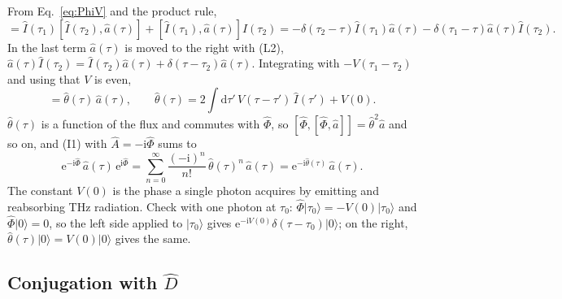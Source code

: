 \documentclass[aps,pra,onecolumn,notitlepage,11pt,amsmath,amssymb,nofootinbib]{revtex4-2}
\newcommand{\Iop}{\hat I}
\newcommand{\dd}{\mathrm{d}}
\newcommand{\ee}{\mathrm{e}}
\newcommand{\ii}{\mathrm{i}}
\begin{document}
From Eq.~\eqref{eq:PhiV} and the product rule,
\begin{equation}
[\Iop(\tau_1)\Iop(\tau_2),\hat a(\tau)]
=\Iop(\tau_1)[\Iop(\tau_2),\hat a(\tau)]+[\Iop(\tau_1),\hat a(\tau)]\Iop(\tau_2)
=-\delta(\tau_2-\tau)\Iop(\tau_1)\hat a(\tau)-\delta(\tau_1-\tau)\hat a(\tau)\Iop(\tau_2).
\end{equation}
In the last term $\hat a(\tau)$ is moved to the right with (L2),
$\hat a(\tau)\Iop(\tau_2)=\Iop(\tau_2)\hat a(\tau)+\delta(\tau-\tau_2)\hat a(\tau)$.
Integrating with $-V(\tau_1-\tau_2)$ and using that $V$ is even,
\begin{equation}
[\hat\Phi,\hat a(\tau)]=\hat\theta(\tau)\,\hat a(\tau),\qquad
\hat\theta(\tau)=2\int\!\dd\tau'\,V(\tau-\tau')\,\Iop(\tau')+V(0).
\label{eq:thetaK}
\end{equation}
$\hat\theta(\tau)$ is a function of the flux and commutes with $\hat\Phi$, so
$[\hat\Phi,[\hat\Phi,\hat a]]=\hat\theta^2\hat a$ and so on, and (I1) with
$\hat A=-\ii\hat\Phi$ sums to
\begin{equation}
\ee^{-\ii\hat\Phi}\,\hat a(\tau)\,\ee^{\ii\hat\Phi}
=\sum_{n=0}^\infty\frac{(-\ii)^n}{n!}\,\hat\theta(\tau)^n\,\hat a(\tau)
=\ee^{-\ii\hat\theta(\tau)}\,\hat a(\tau).
\label{eq:step1}
\end{equation}
The constant $V(0)$ is the phase a single photon acquires by emitting and
reabsorbing THz radiation. Check with one photon at $\tau_0$:
$\hat\Phi|\tau_0\rangle=-V(0)|\tau_0\rangle$ and $\hat\Phi|0\rangle=0$, so the
left side applied to $|\tau_0\rangle$ gives
$\ee^{-\ii V(0)}\delta(\tau-\tau_0)|0\rangle$; on the right,
$\hat\theta(\tau)|0\rangle=V(0)|0\rangle$ gives the same.

\subsection{Conjugation with \texorpdfstring{$\hat D$}{D}}
\end{document}
